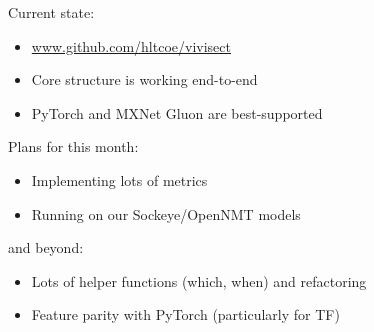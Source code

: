\documentclass{beamer}
\begin{document}
\begin{frame}
  
  \begin{block}{Current state:}
    \begin{itemize}
    \item \url{www.github.com/hltcoe/vivisect}
    \item Core structure is working end-to-end
    \item PyTorch and MXNet Gluon are best-supported
    \end{itemize}
  \end{block}
  
  
  \begin{block}{Plans for this month:}
    \begin{itemize}
    \item Implementing lots of metrics
    \item Running on our Sockeye/OpenNMT models
    \end{itemize}
  \end{block}

  \begin{block}{and beyond:}
    \begin{itemize}
    \item Lots of helper functions (which, when) and refactoring
    \item Feature parity with PyTorch (particularly for TF)
    \end{itemize}
  \end{block}
  
\end{frame}
\end{document}
